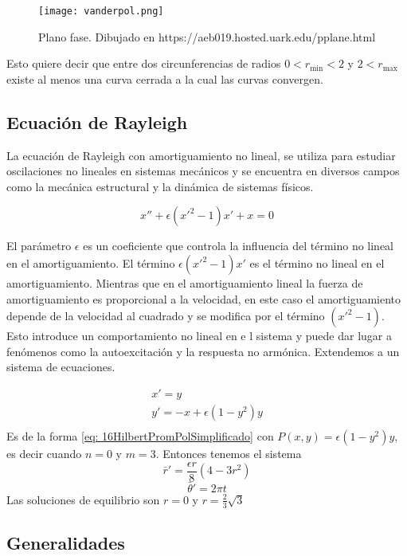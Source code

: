 \begin{figure}[h]
	\centering
	\texttt{[image: vanderpol.png]}
	\caption{Plano fase. Dibujado en https://aeb019.hosted.uark.edu/pplane.html}
\end{figure}

Esto quiere decir que entre dos circunferencias de radios $0<r_{\min}<2$ y $2<r_{\max}$ existe al menos una curva cerrada a la cual las curvas convergen.

\subsection{Ecuación de Rayleigh}
La ecuación de Rayleigh con amortiguamiento no lineal, se utiliza
para estudiar oscilaciones no lineales en sistemas mecánicos y se encuentra en
diversos campos como la mecánica estructural y la dinámica de sistemas físicos.

$$x''+\epsilon(x'^2-1)x'+x=0$$

El parámetro $\epsilon$ es un coeficiente que controla la influencia del término no lineal en el amortiguamiento.
El término $\epsilon(x'^2 - 1)x'$ es el término no lineal en el amortiguamiento. Mientras que en el amortiguamiento
lineal la fuerza de amortiguamiento es proporcional a la velocidad, en este caso el amortiguamiento depende de
la velocidad al cuadrado y se modifica por el término $(x'^2 - 1)$. Esto introduce un comportamiento no lineal en e
l sistema y puede dar lugar a fenómenos como la autoexcitación y la respuesta no armónica.
Extendemos a un sistema de ecuaciones.

\begin{equation}\label{eq: Rayleigh}
	\begin{matrix}
		x'=y \\
		y'=-x+\epsilon(1-y^2)y \\
	\end{matrix}
\end{equation}
Es de la forma \eqref{eq: 16HilbertPromPolSimplificado} con $P(x,y)=\epsilon(1-y^2)y$, es decir cuando $n=0$ y $m=3$.
Entonces tenemos el sistema
$$\bar{r}'=\frac{\epsilon r}{8}(4-3r^2)$$
$$\bar{\theta}'=2\pi t$$
Las soluciones de equilibrio son $r=0$ y $r=\frac{2}{3}\sqrt{3}$

\subsection{Generalidades}


